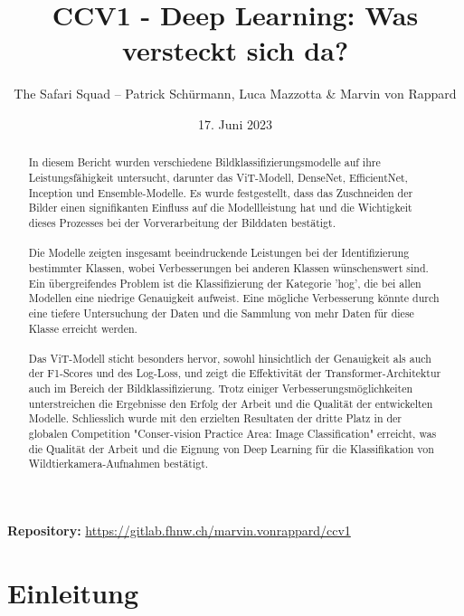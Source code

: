 \documentclass{article}
\title{CCV1 - Deep Learning: Was versteckt sich da?}
\author{The Safari Squad – Patrick Schürmann, Luca Mazzotta \& Marvin von Rappard}
\date{17. Juni 2023}
\begin{document}
\maketitle

\begin{center}
\textbf{Repository:} \url{https://gitlab.fhnw.ch/marvin.vonrappard/ccv1}
\end{center}

\begin{abstract}

In diesem Bericht wurden verschiedene Bildklassifizierungsmodelle auf ihre Leistungsfähigkeit untersucht, darunter das ViT-Modell, DenseNet, EfficientNet, Inception und Ensemble-Modelle. Es wurde festgestellt, dass das Zuschneiden der Bilder einen signifikanten Einfluss auf die Modellleistung hat und die Wichtigkeit dieses Prozesses bei der Vorverarbeitung der Bilddaten bestätigt.\\\\
Die Modelle zeigten insgesamt beeindruckende Leistungen bei der Identifizierung bestimmter Klassen, wobei Verbesserungen bei anderen Klassen wünschenswert sind. Ein übergreifendes Problem ist die Klassifizierung der Kategorie 'hog', die bei allen Modellen eine niedrige Genauigkeit aufweist. Eine mögliche Verbesserung könnte durch eine tiefere Untersuchung der Daten und die Sammlung von mehr Daten für diese Klasse erreicht werden.\\\\
Das ViT-Modell sticht besonders hervor, sowohl hinsichtlich der Genauigkeit als auch der F1-Scores und des Log-Loss, und zeigt die Effektivität der Transformer-Architektur auch im Bereich der Bildklassifizierung. Trotz einiger Verbesserungsmöglichkeiten unterstreichen die Ergebnisse den Erfolg der Arbeit und die Qualität der entwickelten Modelle. Schliesslich wurde mit den erzielten Resultaten der dritte Platz in der globalen Competition "Conser-vision Practice Area: Image Classification" erreicht, was die Qualität der Arbeit und die Eignung von Deep Learning für die Klassifikation von Wildtierkamera-Aufnahmen bestätigt.

\end{abstract}

\newpage

\tableofcontents

\newpage

\section{Einleitung}
\end{document}
